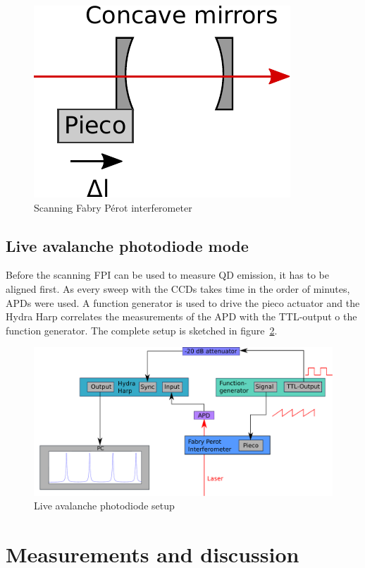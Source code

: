 \begin{figure}[H]
	\centering
	\includegraphics[width=0.4\linewidth]{figures/fabry-perot/setup/setup}
	\caption{Scanning Fabry Pérot interferometer}
	\label{fig:setup}
\end{figure}


\subsection{Live avalanche photodiode mode}

Before the scanning \ac{FPI} can be used to measure \ac{QD} emission, it has to be aligned first.
As every sweep with the \acp{CCD} takes time in the order of minutes, \acp{APD} were used.
A function generator is used to drive the pieco actuator and the Hydra Harp correlates the measurements of the \ac{APD} with the TTL-output o the function generator. The complete setup is sketched in figure~\ref{fig:live-apd-setup}.


\begin{figure}[H]
	\centering
	\includegraphics[width=\linewidth]{figures/fabry-perot/live-apd-setup}
	\caption{Live avalanche photodiode setup}
	\label{fig:live-apd-setup}
\end{figure}


\section{Measurements and discussion}
\label{sec:fabry-measurements}

